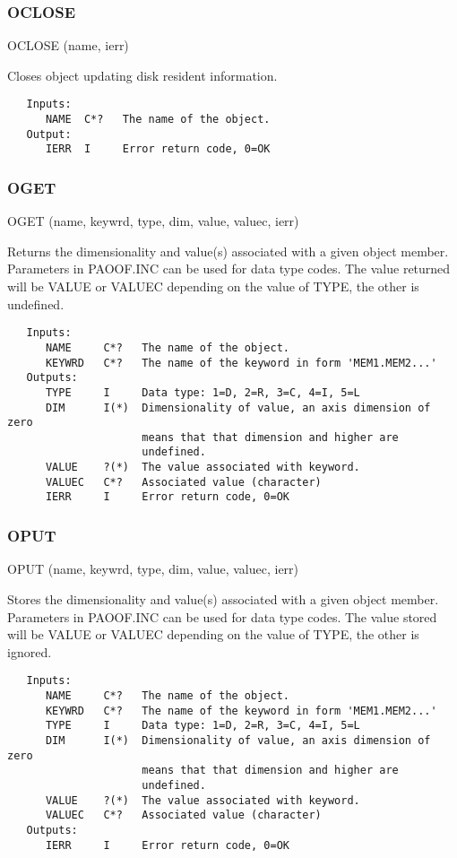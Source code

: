 \subsubsection{OCLOSE}
    OCLOSE (name, ierr)

   Closes object updating disk resident information.
{\small\begin{verbatim}
   Inputs:
      NAME  C*?   The name of the object.
   Output:
      IERR  I     Error return code, 0=OK
\end{verbatim}}
\subsubsection{OGET}
   OGET (name, keywrd, type, dim, value, valuec, ierr)

   Returns the dimensionality and value(s) associated with a given
object member.  Parameters in PAOOF.INC can be used for data type
codes.  The value returned will be VALUE or VALUEC depending on the
value of TYPE, the other is undefined.
{\small\begin{verbatim}
   Inputs:
      NAME     C*?   The name of the object.
      KEYWRD   C*?   The name of the keyword in form 'MEM1.MEM2...'
   Outputs:
      TYPE     I     Data type: 1=D, 2=R, 3=C, 4=I, 5=L
      DIM      I(*)  Dimensionality of value, an axis dimension of zero
                     means that that dimension and higher are
                     undefined.
      VALUE    ?(*)  The value associated with keyword.
      VALUEC   C*?   Associated value (character)
      IERR     I     Error return code, 0=OK
\end{verbatim}}
\subsubsection{OPUT}
    OPUT (name, keywrd, type, dim, value, valuec, ierr)

   Stores the dimensionality and value(s) associated with a given
object member.   Parameters in PAOOF.INC can be used for data type
codes.  The value stored will be VALUE or VALUEC depending on the
value of TYPE, the other is ignored.
{\small\begin{verbatim}
   Inputs:
      NAME     C*?   The name of the object.
      KEYWRD   C*?   The name of the keyword in form 'MEM1.MEM2...'
      TYPE     I     Data type: 1=D, 2=R, 3=C, 4=I, 5=L
      DIM      I(*)  Dimensionality of value, an axis dimension of zero
                     means that that dimension and higher are
                     undefined.
      VALUE    ?(*)  The value associated with keyword.
      VALUEC   C*?   Associated value (character)
   Outputs:
      IERR     I     Error return code, 0=OK
\end{verbatim}}

